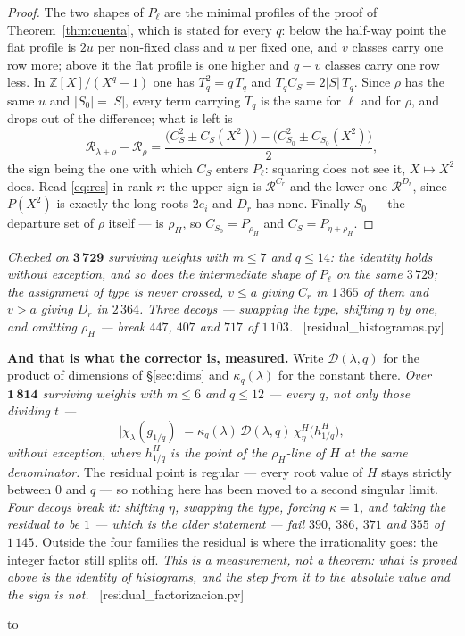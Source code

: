 \documentclass[11pt,a4paper]{article}
\theoremstyle{definition}
\newcommand{\ZZ}{\mathbb{Z}}
\newcommand{\ver}[1]{\unskip\penalty0\ \textcolor{azul}{\small\textsf{[#1]}}}
\newenvironment{keybox}
  {\par\vspace{9pt}\begin{lrbox}{\fichabox}%
   \begin{minipage}{0.90\textwidth}\vspace{7pt}\setlength{\parskip}{3pt}}
  {\vspace{7pt}\end{minipage}\end{lrbox}%
   \par\noindent\hbox to \textwidth{\hfill
   \textcolor{azul}{\rule[-\dp\fichabox]{3.2pt}{\dimexpr\ht\fichabox+\dp\fichabox\relax}}%
   \colorbox{fondoficha}{\usebox{\fichabox}}\hfill}%
   \par\vspace{9pt}}
\begin{document}
\begin{proof}
The two shapes of $P_\ell$ are the minimal profiles of the proof of Theorem~\ref{thm:cuenta},
which is stated for every $q$: below the
half-way point the flat profile is $2u$ per non-fixed class and $u$ per fixed one, and $v$ classes
carry one row more; above it the flat profile is one higher and $q-v$ classes carry one row less.
In $\ZZ[X]/(X^q-1)$ one has $T_q^2=q\,T_q$ and $T_qC_S=2|S|\,T_q$. Since $\rho$ has the same $u$
and $|S_0|=|S|$, every term carrying $T_q$ is the same for $\ell$ and for $\rho$, and drops out of
the difference; what is left is
\[
\mathscr{R}_{\lambda+\rho}-\mathscr{R}_\rho
=\frac{\bigl(C_S^2\pm C_S(X^2)\bigr)-\bigl(C_{S_0}^2\pm C_{S_0}(X^2)\bigr)}{2},
\]
the sign being the one with which $C_S$ enters $P_\ell$: squaring does not see it, $X\mapsto X^2$
does. Read \eqref{eq:res} in rank $r$: the upper sign is $\mathscr{R}^{C_r}$ and the lower one
$\mathscr{R}^{D_r}$, since $P(X^2)$ is exactly the long roots $2e_i$ and $D_r$ has none. Finally
$S_0$ --- the departure set of $\rho$ itself --- is $\rho_H$, so $C_{S_0}=P_{\rho_H}$ and
$C_S=P_{\eta+\rho_H}$.
\end{proof}

\noindent \emph{Checked on $\mathbf{3\,729}$ surviving weights with $m\le7$ and $q\le14$: the
identity holds without exception, and so does the intermediate shape of $P_\ell$ on the same
$3\,729$; the assignment of type is never crossed, $v\le a$ giving $C_r$ in $1\,365$ of them and
$v>a$ giving $D_r$ in $2\,364$. Three decoys --- swapping the type, shifting $\eta$ by one, and
omitting $\rho_H$ --- break $447$, $407$ and $717$ of $1\,103$.}
\ver{residual\_histogramas.py}

\begin{keybox}
\textbf{And that is what the corrector is, measured.} Write $\mathcal D(\lambda,q)$ for the product
of dimensions of \S\ref{sec:dims} and $\kappa_q(\lambda)$ for the constant there. \emph{Over
$\mathbf{1\,814}$ surviving weights with $m\le6$ and $q\le12$ --- every $q$, not only those
dividing $t$ ---}
\[
\bigl|\chi_\lambda(g_{1/q})\bigr|
=\kappa_q(\lambda)\,\mathcal D(\lambda,q)\,\chi^{H}_{\eta}\bigl(h^{H}_{1/q}\bigr),
\]
\emph{without exception, where $h^H_{1/q}$ is the point of the $\rho_H$-line of $H$ at the same
denominator.} The residual point is regular --- every root value of $H$ stays strictly between $0$
and $q$ --- so nothing here has been moved to a second singular limit. \emph{Four decoys break it:
shifting $\eta$, swapping the type, forcing $\kappa=1$, and taking the residual to be $1$ --- which
is the older statement --- fail $390$, $386$, $371$ and $355$ of $1\,145$.} Outside the four
families the residual is where the irrationality goes: the integer factor still splits off.
\emph{This is a measurement, not a theorem: what is proved above is the identity of histograms, and
the step from it to the absolute value and the sign is not.}
\ver{residual\_factorizacion.py}
\end{keybox}
\end{document}
